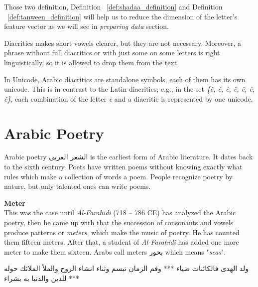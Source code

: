 Those two definition, Definition ~\ref{def:shadaa_definition} and Definition ~\ref{def:tanween_definition}  will help us to reduce the dimension of the letter's feature vector as we will see in \textit{preparing data} section.


Diacritics makes short vowels clearer, but they are not necessary.
Moreover, a phrase without full diacritics or with just some on some letters is
right linguistically, so it is allowed to drop them from the text.

In Unicode, Arabic diacritics are standalone symbols, each of them has its own
unicode. This is in contrast to the Latin diacritics; e.g., in the set
\textit{\{ê, é, è, ë, ē, ĕ, ě\}}, each combination of the letter \textit{e} and a diacritic is represented by one unicode.

\newpage
\section{Arabic Poetry } %
Arabic poetry \textarabic{الشعر العربى} is the earliest form of Arabic literature. It dates back to the sixth century. Poets have written poems without knowing exactly what rules which make a collection of words a poem. People recognize poetry by nature, but only talented ones can write poems. %


\begin{definition}\label{def:meter}
  \textbf{Meter} \hfill \\
This was the case until \textit{Al-Farahidi} (718 – 786 CE) has analyzed the
Arabic poetry, then he came up with that the succession of consonants and vowels
produce patterns or \textit{meters}, which make the music of poetry.  He has
counted them fifteen meters.  After that, a student of \textit{Al-Farahidi} has
added one more meter to make them sixteen. Arabs call meters \textarabic{بحور}
which means "\textit{seas}".


\begin{Arabic}
	\begin{traditionalpoem*}
          ولد الهدى فالكائنات ضياء *** وفم الزمان تبسم وثناء انشاء
          الروح والملأ الملائك حوله *** للدين والدنيا به بشراء

	\end{traditionalpoem*}
\end{Arabic}%
  

\end{definition}


